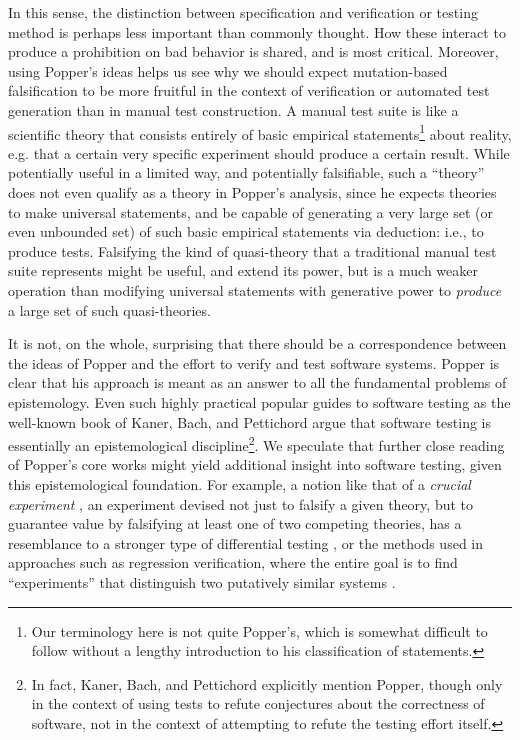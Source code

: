 \documentclass{svjour3}
\begin{document}
\noindent In this sense, the distinction between specification and
verification or testing method is perhaps less important than commonly
thought.  How these interact to produce a prohibition on bad behavior
is shared, and is most critical.  Moreover, using Popper's ideas helps
us see why we should expect mutation-based falsification to be more
fruitful in the context of verification or automated test generation
than in manual test construction.  A manual test suite is like a
scientific theory that consists entirely of basic empirical
statements\footnote{Our terminology here is not quite Popper's, which
  is somewhat difficult to follow without a lengthy introduction to
 his  classification of statements.} about
reality, e.g. that a certain very specific experiment should produce a certain
result.   While potentially useful in a limited way, and potentially falsifiable, such
a ``theory'' does not even qualify as a theory in Popper's analysis,
since he expects theories to make universal statements, and be capable
of generating a very large set (or even unbounded set) of such basic
empirical statements via deduction: i.e., to produce tests.  Falsifying the kind of quasi-theory
that a traditional manual test suite represents might be useful, and
extend its power, but is a much weaker operation than modifying
universal statements with generative power to \emph{produce} a large
set of such quasi-theories.

It is not, on the whole, surprising that there should be a
correspondence between the ideas of Popper and the effort to verify
and test software systems.  Popper is clear that his approach is meant
as an answer to all the fundamental problems of epistemology.  Even
such highly practical popular guides to software testing as the
well-known book of Kaner, Bach, and Pettichord \cite{kaner} argue that
software testing is essentially an epistemological
discipline\footnote{In fact, Kaner, Bach, and Pettichord explicitly
  mention Popper, though only in the context of using tests to refute
  conjectures about the correctness of software, not in the context of
  attempting to refute the testing effort itself.}.  We speculate that
further close reading of Popper's core works might yield additional
insight into software testing, given this epistemological foundation.
For example, a notion like that of a \emph{crucial experiment}
\cite{Popper}, an experiment
devised not just to falsify a given theory, but to guarantee value by
falsifying at least one of two competing theories, has a resemblance
to a stronger type of differential testing \cite{Differential}, or the
methods used in approaches such as regression verification, where the
entire goal is to find ``experiments'' that distinguish two putatively
similar systems \cite{strichman2008regression}.
\end{document}
